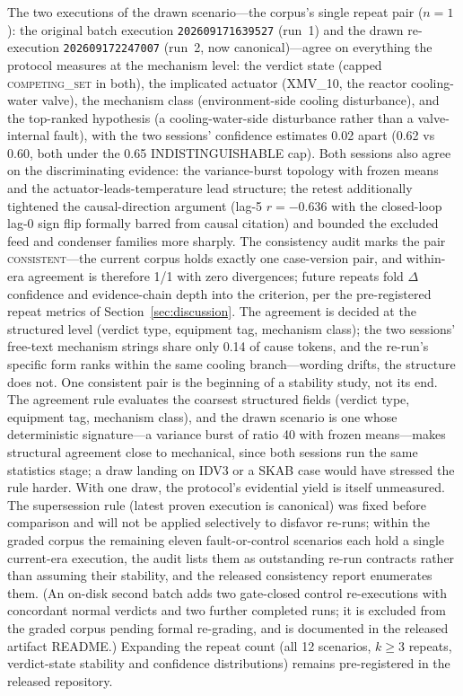 \documentclass[preprint,12pt]{elsarticle}
\begin{document}
The two executions of the drawn scenario---the corpus's single repeat pair ($n{=}1$): the original batch execution \texttt{202609171639527} (run~1) and the drawn re-execution \texttt{202609172247007} (run~2, now canonical)---agree on everything the protocol measures at the mechanism level: the verdict state (capped \mbox{\textsc{competing\_set}} in both), the implicated actuator (XMV\_10, the reactor cooling-water valve), the mechanism class (environment-side cooling disturbance), and the top-ranked hypothesis (a cooling-water-side disturbance rather than a valve-internal fault), with the two sessions' confidence estimates 0.02 apart (0.62 vs 0.60, both under the 0.65 INDISTINGUISHABLE cap). Both sessions also agree on the discriminating evidence: the variance-burst topology with frozen means and the actuator-leads-temperature lead structure; the retest additionally tightened the causal-direction argument (lag-5 $r{=}{-}0.636$ with the closed-loop lag-0 sign flip formally barred from causal citation) and bounded the excluded feed and condenser families more sharply. The consistency audit marks the pair \textsc{consistent}---the current corpus holds exactly one case-version pair, and within-era agreement is therefore 1/1 with zero divergences; future repeats fold $\Delta$confidence and evidence-chain depth into the criterion, per the pre-registered repeat metrics of Section~\ref{sec:discussion}. The agreement is decided at the structured level (verdict type, equipment tag, mechanism class); the two sessions' free-text mechanism strings share only 0.14 of cause tokens, and the re-run's specific form ranks within the same cooling branch---wording drifts, the structure does not. One consistent pair is the beginning of a stability study, not its end. The agreement rule evaluates the coarsest structured fields (verdict type, equipment tag, mechanism class), and the drawn scenario is one whose deterministic signature---a variance burst of ratio 40 with frozen means---makes structural agreement close to mechanical, since both sessions run the same statistics stage; a draw landing on IDV3 or a SKAB case would have stressed the rule harder. With one draw, the protocol's evidential yield is itself unmeasured. The supersession rule (latest proven execution is canonical) was fixed before comparison and will not be applied selectively to disfavor re-runs; within the graded corpus the remaining eleven fault-or-control scenarios each hold a single current-era execution, the audit lists them as outstanding re-run contracts rather than assuming their stability, and the released consistency report enumerates them. (An on-disk second batch adds two gate-closed control re-executions with concordant normal verdicts and two further completed runs; it is excluded from the graded corpus pending formal re-grading, and is documented in the released artifact README.) Expanding the repeat count (all 12 scenarios, $k \ge 3$ repeats, verdict-state stability and confidence distributions) remains pre-registered in the released repository.
\end{document}
